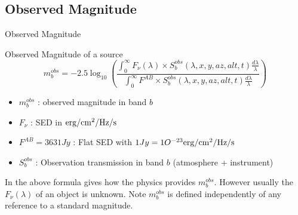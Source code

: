 \documentclass{beamer}
\begin{document}
\subsection{Observed Magnitude}
\begin{frame}{Observed Magnitude}
\begin{alertblock}{Observed Magnitude of a source}
	\begin{equation}
	m^{obs}_b = -2.5 \log_{10}\left( 
	\frac{\int_0^\infty F_\nu(\lambda) \times S_b^{obs}(\lambda,x,y,az,alt,t) \frac{d\lambda}{\lambda} }{\int_0^\infty F^{AB} \times S_b^{obs}(\lambda,x,y,az,alt,t) \frac{d\lambda}{\lambda}} 
	\right)
	\end{equation}
	\begin{itemize}
	\item $m^{obs}_b$ : observed magnitude in band $b$
	\item $F_\nu$ : SED in ${\rm erg/cm^2/Hz/s}$
	\item $F^{AB}=3631 Jy$ : Flat SED with $1 Jy = 1O^{-23} {\rm erg/cm^2/Hz/s}$
	\item $S_b^{obs}$ : Observation transmission in band $b$  (atmosphere + instrument)
	\end{itemize}
	\end{alertblock}	
In the above formula gives how the physics provides $m_b^{obs}$. However usually the $F_\nu(\lambda)$ of an object is unknown.	
Note $m^{obs}_b$ is defined independently of any reference to a standard magnitude.
\end{frame}
\end{document}
